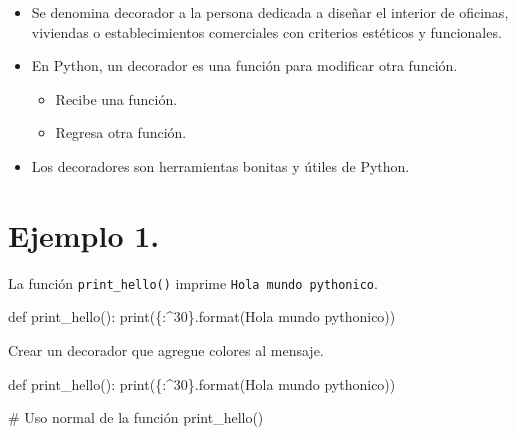 \documentclass[
  letterpaper,
  DIV=11,
  numbers=noendperiod]{scrreprt}
\newenvironment{Shaded}{\begin{snugshade}}{\end{snugshade}}
\newcommand{\BuiltInTok}[1]{\textcolor[rgb]{0.00,0.23,0.31}{#1}}
\newcommand{\CommentTok}[1]{\textcolor[rgb]{0.37,0.37,0.37}{#1}}
\newcommand{\KeywordTok}[1]{\textcolor[rgb]{0.00,0.23,0.31}{#1}}
\newcommand{\NormalTok}[1]{\textcolor[rgb]{0.00,0.23,0.31}{#1}}
\newcommand{\SpecialCharTok}[1]{\textcolor[rgb]{0.37,0.37,0.37}{#1}}
\newcommand{\StringTok}[1]{\textcolor[rgb]{0.13,0.47,0.30}{#1}}
\providecommand{\tightlist}{%
  \setlength{\itemsep}{0pt}\setlength{\parskip}{0pt}}\usepackage{longtable,booktabs,array}
\begin{document}
\begin{itemize}
\tightlist
\item
  Se denomina decorador a la persona dedicada a diseñar el interior de
  oficinas, viviendas o establecimientos comerciales con criterios
  estéticos y funcionales.
\item
  En Python, un decorador es una función para modificar otra función.

  \begin{itemize}
  \tightlist
  \item
    Recibe una función.
  \item
    Regresa otra función.
  \end{itemize}
\item
  Los decoradores son herramientas bonitas y útiles de Python.
\end{itemize}

\section{\texorpdfstring{\textbf{Ejemplo
1.}}{Ejemplo 1.}}\label{ejemplo-1.-7}

La función \texttt{print\_hello()} imprime
\texttt{Hola\ mundo\ pythonico}.

\begin{Shaded}
\begin{Highlighting}[]
\KeywordTok{def}\NormalTok{ print\_hello():}
    \BuiltInTok{print}\NormalTok{(}\StringTok{\textquotesingle{}}\SpecialCharTok{\{:\^{}30\}}\StringTok{\textquotesingle{}}\NormalTok{.}\BuiltInTok{format}\NormalTok{(}\StringTok{\textquotesingle{}Hola mundo pythonico\textquotesingle{}}\NormalTok{))}
\end{Highlighting}
\end{Shaded}

Crear un decorador que agregue colores al mensaje.

\begin{Shaded}
\begin{Highlighting}[]
\KeywordTok{def}\NormalTok{ print\_hello():}
    \BuiltInTok{print}\NormalTok{(}\StringTok{\textquotesingle{}}\SpecialCharTok{\{:\^{}30\}}\StringTok{\textquotesingle{}}\NormalTok{.}\BuiltInTok{format}\NormalTok{(}\StringTok{\textquotesingle{}Hola mundo pythonico\textquotesingle{}}\NormalTok{))}
\end{Highlighting}
\end{Shaded}

\begin{Shaded}
\begin{Highlighting}[]
\CommentTok{\# Uso normal de la función}
\NormalTok{print\_hello()}
\end{Highlighting}
\end{Shaded}
\end{document}
